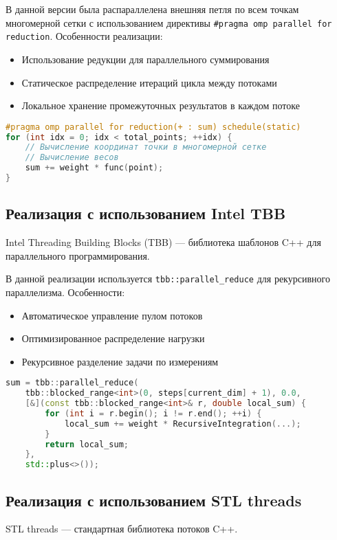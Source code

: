 \documentclass[14pt,a4paper]{extarticle}
\begin{document}
В данной версии была распараллелена внешняя петля по всем точкам многомерной сетки с использованием директивы \texttt{\#pragma omp parallel for reduction}. Особенности реализации:

\begin{itemize}
    \item Использование редукции для параллельного суммирования
    \item Статическое распределение итераций цикла между потоками
    \item Локальное хранение промежуточных результатов в каждом потоке
\end{itemize}

\begin{lstlisting}[language=C++]
#pragma omp parallel for reduction(+ : sum) schedule(static)
for (int idx = 0; idx < total_points; ++idx) {
    // Вычисление координат точки в многомерной сетке
    // Вычисление весов
    sum += weight * func(point);
}
\end{lstlisting}

\subsection{Реализация с использованием Intel TBB}
Intel Threading Building Blocks (TBB) — библиотека шаблонов C++ для параллельного программирования.

В данной реализации используется \texttt{tbb::parallel\_reduce} для рекурсивного параллелизма. Особенности:

\begin{itemize}
    \item Автоматическое управление пулом потоков
    \item Оптимизированное распределение нагрузки
    \item Рекурсивное разделение задачи по измерениям
\end{itemize}

\begin{lstlisting}[language=C++]
sum = tbb::parallel_reduce(
    tbb::blocked_range<int>(0, steps[current_dim] + 1), 0.0,
    [&](const tbb::blocked_range<int>& r, double local_sum) {
        for (int i = r.begin(); i != r.end(); ++i) {
            local_sum += weight * RecursiveIntegration(...);
        }
        return local_sum;
    },
    std::plus<>());
\end{lstlisting}

\subsection{Реализация с использованием STL threads}
STL threads — стандартная библиотека потоков C++.
\end{document}
